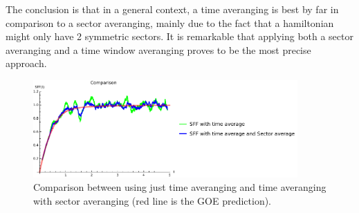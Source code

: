 \documentclass[10pt,a4paper]{article}
\begin{document}
The conclusion is that in a general context, a time averanging is best by far in comparison to a sector averanging, mainly due to the 
fact that a hamiltonian might only have 2 symmetric sectors. It is remarkable that applying both a sector averanging and a time window averanging proves to be the most precise approach.
\begin{figure}[H]
    \centering
    \includegraphics[width=0.9\textwidth]{CompSectAndTime.pdf}
    \caption{Comparison between using just time averanging and time averanging with sector averanging (red line is the GOE prediction).}
    \label{fig:CompSectAndTime}
\end{figure}
\end{document}
